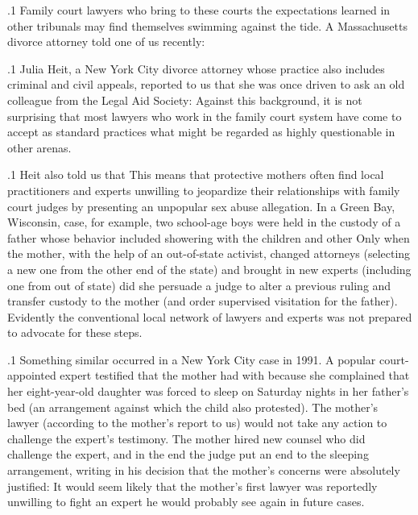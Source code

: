 \documentclass[11pt, twoside]{article}
\begin{document}
{\p.1{%
Family court lawyers who bring to these courts the expectations
learned in other tribunals may find themselves swimming against the
tide. A Massachusetts divorce attorney told one of us recently: 
}%

\p.1{%
Julia Heit, a New York City divorce attorney whose practice also includes criminal and civil appeals, reported to us that she was once driven
to ask an old colleague from the Legal Aid Society:  Against
this background, it is not surprising that most lawyers who work in
the family court system have come to accept as standard practices what
might be regarded as highly questionable in other arenas.
}%

\p.1{%
Heit also told us that  This
means that protective mothers often find local practitioners and experts
unwilling to jeopardize their relationships with family court judges by
presenting an unpopular sex abuse allegation. In a Green Bay, Wisconsin, case, for example, two school-age boys were held in the custody
of a father whose behavior included showering with the children and
other  Only when the mother, with the help of an out-of-state activist,
changed attorneys (selecting a new one from the other end of the state)
and brought in new experts (including one from out of state) did she
persuade a judge to alter a previous ruling and transfer custody to the
mother (and order supervised visitation for the father). Evidently the
conventional local network of lawyers and experts was not prepared to
advocate for these steps.
}%

\p.1{%
Something similar occurred in a New York City case in 1991. A popular court-appointed expert testified that the mother had  with  because she complained that her eight-year-old daughter was forced to sleep on Saturday
nights in her father’s bed (an arrangement against which the child also
protested). The mother’s lawyer (according to the mother’s report to
us) would not take any action to challenge the expert’s testimony. The
mother hired new counsel who did challenge the expert, and in the end
the judge put an end to the sleeping arrangement, writing in his decision
that the mother’s concerns were absolutely justified:  It would seem likely
that the mother’s first lawyer was reportedly unwilling to fight an expert
he would probably see again in future cases.
}%

}
\end{document}
